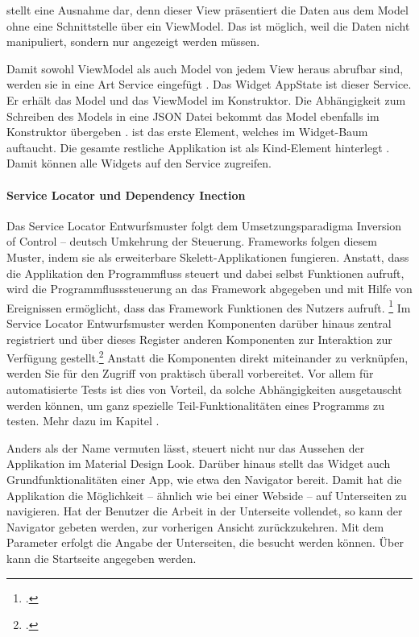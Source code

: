   stellt eine Ausnahme dar, denn dieser View präsentiert die Daten aus dem Model ohne eine Schnittstelle über ein ViewModel.
Das ist möglich, weil die Daten nicht manipuliert, sondern nur angezeigt werden müssen.

Damit sowohl ViewModel als auch Model von jedem View heraus abrufbar sind, werden sie in eine Art Service eingefügt .
Das Widget AppState ist dieser Service.
 Er erhält das Model  und das ViewModel   im Konstruktor.
Die Abhängigkeit zum Schreiben des Models in eine JSON Datei  bekommt das Model ebenfalls im Konstruktor übergeben .
 ist das erste Element, welches im Widget-Baum auftaucht.
Die gesamte restliche Applikation ist als Kind-Element hinterlegt .
Damit können alle Widgets auf den Service zugreifen.


\paragraph{Service Locator und Dependency Inection}

Das Service Locator Entwurfsmuster folgt dem Umsetzungsparadigma Inversion of Control – deutsch Umkehrung der Steuerung.
Frameworks folgen diesem Muster, indem sie als erweiterbare Skelett-Applikationen fungieren.
Anstatt, dass die Applikation den Programmfluss steuert und dabei selbst Funktionen aufruft, wird die Programmflusssteuerung an das Framework abgegeben und mit Hilfe von Ereignissen ermöglicht, dass das Framework Funktionen des Nutzers aufruft.
\footcite[Vgl.][]{johnson1988designing}
Im Service Locator Entwurfsmuster werden Komponenten darüber hinaus zentral registriert und über dieses Register anderen Komponenten zur Interaktion zur Verfügung gestellt.\footcite[Vgl.][]{fowler2004DependencyInjection}
Anstatt die Komponenten direkt miteinander zu verknüpfen, werden Sie für den Zugriff von praktisch überall vorbereitet.
Vor allem für automatisierte Tests ist dies von Vorteil, da solche Abhängigkeiten ausgetauscht werden können, um ganz spezielle Teil-Funktionalitäten eines Programms zu testen.
 Mehr dazu im Kapitel .


Anders als der Name vermuten lässt, steuert  nicht nur das Aussehen der Applikation im Material Design Look.
Darüber hinaus stellt das Widget auch Grundfunktionalitäten einer App, wie etwa den Navigator bereit.
Damit hat die Applikation die Möglichkeit – ähnlich wie bei einer Webside – auf Unterseiten zu navigieren.
Hat der Benutzer die Arbeit in der Unterseite vollendet, so kann der Navigator gebeten werden, zur vorherigen Ansicht zurückzukehren.
 Mit dem Parameter   erfolgt die Angabe der Unterseiten, die besucht werden können.
Über   kann die Startseite angegeben werden.

